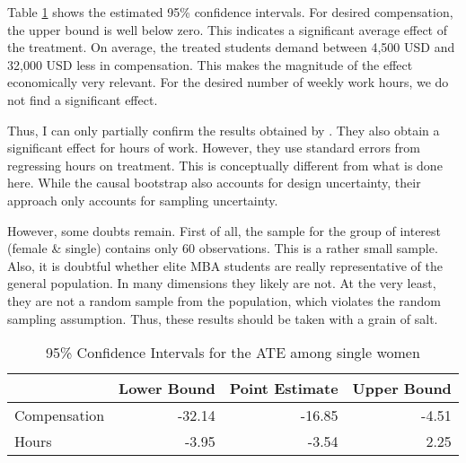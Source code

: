 \documentclass[aodsor,preprint]{imsart}
\numberwithin{equation}{section}
\theoremstyle{plain}
\begin{document}
Table \ref{CIs} shows the estimated 95\% confidence intervals. For desired compensation, the upper bound is well below zero. This indicates a significant average effect of the treatment. On average, the treated students demand between 4,500 USD and 32,000 USD less in compensation. This makes the magnitude of the effect economically very relevant. For the desired number of weekly work hours, we do not find a significant effect.

Thus, I can only partially confirm the results obtained by \cite{Bursztyn_2017}. They also obtain a significant effect for hours of work. However, they use standard errors from regressing hours on treatment. This is conceptually different from what is done here. While the causal bootstrap also accounts for design uncertainty, their approach only accounts for sampling uncertainty.

However, some doubts remain. First of all, the sample for the group of interest (female \& single) contains only 60 observations. This is a rather small sample. Also, it is doubtful whether elite MBA students are really representative of the general population. In many dimensions they likely are not. At the very least, they are not a random sample from the population, which violates the random sampling assumption. Thus, these results should be taken with a grain of salt. 


\begin{table}
	\centering
	\caption{95\% Confidence Intervals for the ATE among single women}
	\label{CIs}
	\begin{tabular}{l|r|r|r}
		\hline
		& Lower Bound & Point Estimate & Upper Bound\\
		\hline
		Compensation & -32.14 & -16.85 & -4.51\\
		\hline
		Hours & -3.95 & -3.54 & 2.25\\
		\hline
	\end{tabular}
\end{table}







{}
\end{document}
